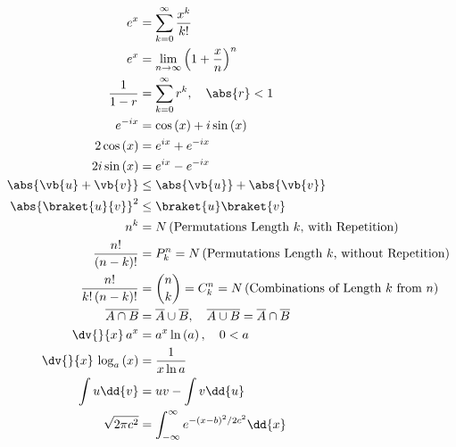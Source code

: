 \begin{subequations}\label{eq:misc:math}
\begin{align}
e^{x} &= \sum_{k=0}^{\infty} \frac{x^{k}}{k!} \label{eq:misc:math:ex} \\
e^{x} &= \lim_{n \to \infty} \left(1 + \frac{x}{n}\right)^{n} \label{eq:misc:math:ex_limit} \\
\frac{1}{1-r} &= \sum_{k=0}^{\infty} r^{k}, \quad \abs{r} < 1 \label{eq:misc:math:geometric} \\
e^{-i x} &= \cos\left(x\right) + i \sin\left(x\right) \label{eq:misc:math:eulers_formula} \\
2 \cos\left(x\right) &= e^{i x} + e^{-i x} \label{eq:misc:math:cos_exp} \\
2i \sin\left(x\right) &= e^{i x} - e^{-i x} \label{eq:misc:math:sin_exp} \\
\abs{\vb{u} + \vb{v}} &\leq \abs{\vb{u}} + \abs{\vb{v}} \label{eq:misc:math:triangle_inequality} \\
\abs{\braket{u}{v}}^{2} &\leq \braket{u} \braket{v} \label{eq:misc:math:cauchy_schwarz_inequality} \\
n^{k} &= N\left(\text{Permutations Length $k$, with Repetition}\right) \label{eq:misc:math:permutations_with_repetition} \\
\frac{n!}{\left(n-k\right)!} &= P_{k}^{n} = N\left(\text{Permutations Length $k$, without Repetition}\right) \label{eq:misc:math:permutations_without_repetition} \\
\frac{n!}{k!\left(n-k\right)!} &= \binom{n}{k} = C_{k}^{n} = N\left(\text{Combinations of Length $k$ from $n$}\right) \label{eq:misc:math:binomial_coefficient} \\
\overline{A \cap B} &= \overline{A} \cup \overline{B},\quad \overline{A \cup B} = \overline{A} \cap \overline{B} \label{eq:misc:math:de_morgan} \\
\dv{}{x}\, a^{x} &= a^{x} \ln\left(a\right), \quad 0 < a \label{eq:misc:math:diff_exp_gen} \\
\dv{}{x}\, \log_{a}\left(x\right) &= \frac{1}{x \ln a} \label{eq:misc:math:diff_log_gen} \\
\int u \dd{v} &= uv - \int v \dd{u} \label{eq:misc:math:integration_by_parts} \\
\sqrt{2 \pi c^{2}} &= \int_{-\infty}^{\infty} e^{-\left(x-b\right)^{2} / 2 c^{2}} \dd{x} \label{eq:misc:math:gaussian_integral}
\end{align}
\end{subequations}
